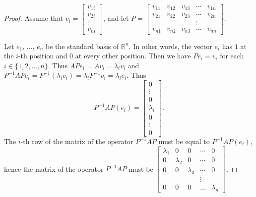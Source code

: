 \documentclass[11pt]{article}
\theoremstyle{definition}
\theoremstyle{plain}
\begin{document}
\begin{proof}
Assume that \( v_i=\left[\begin{array}{c} v_{1i}\\v_{2i}\\\vdots\\v_{ni}\end{array}\right]\), and let \( P= \left[\begin{array}{ccccc} v_{11}&v_{12}&v_{13}&\cdots&v_{1n}\\ v_{21}&v_{22}&v_{23}&\cdots&v_{2n}\\ & & &\vdots& \\ v_{n1}&v_{n2}&v_{n3}&\cdots&v_{nn} \end{array}\right]\).

Let \( e_1 \), \( \dots \), \( e_n \) be the standard basis of \( \mathbb R^n \). In other words, the vector \( e_i \) has \( 1 \) at the \( i \)-th position and \( 0 \) at every other position. Then we have \( Pe_i=v_i \) for each \( i\in\{1,2,\dots, n\} \). Thus \( APe_i=Av_i=\lambda_iv_i \) and \( P^{-1}APe_i=P^{-1}(\lambda_iv_i)=\lambda_iP^{-1}v_i=\lambda_ie_i \). Thus \[ P^{-1}AP(e_i)=\left[\begin{array}{c}0\\\vdots\\0\\\lambda_i\\0\\\vdots\\0\end{array}\right].\] The \( i \)-th row of the matrix of the operator \( P^{-1}AP \) must be equal to \( P^{-1}AP(e_i) \), hence the matrix of the operator \( P^{-1}AP \) must be \( \left[\begin{array}{ccccc} \lambda_1&0&0&\cdots&0\\0&\lambda_2&0&\cdots&0\\ 0&0&\lambda_3&\cdots&0\\&&&\vdots&\\ 0&0&0&\dots&\lambda_n\end{array}\right]\).
\end{proof}
\end{document}
